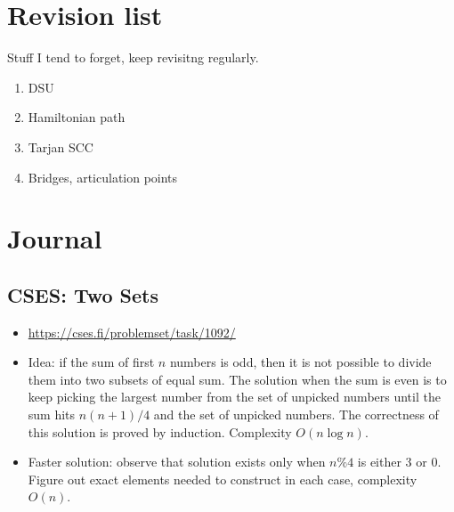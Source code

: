 \documentclass[titlepage, 12pt]{book}
\begin{document}
\chapter{Revision list}
Stuff I tend to forget, keep revisitng regularly.
\begin{enumerate}
  \item DSU
  \item Hamiltonian path
  \item Tarjan SCC
  \item Bridges, articulation points
\end{enumerate}

\chapter{Journal}

\section{CSES: Two Sets}

\begin{itemize}
    \item \url{https://cses.fi/problemset/task/1092/}
    \item Idea: if the sum of first $n$ numbers is odd, then it is not possible to
        divide them into two subsets of equal sum. The solution when the sum is even is
        to keep picking the largest number from the set of unpicked numbers until the
        sum hits $n(n+1)/4$ and the set of unpicked numbers. The correctness of this
        solution is proved by induction. Complexity $O(n\log n)$.
    \item Faster solution: observe that solution exists only when $n\%4$ is
        either 3 or 0. Figure out exact elements needed to construct in each
        case, complexity $O(n)$.
\end{itemize}
\end{document}
